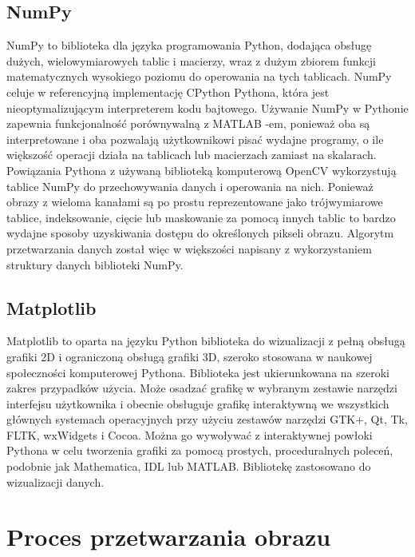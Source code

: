 \documentclass[a4paper,11pt,twoside,openright]{article} %
\begin{document}
\subsection{NumPy}
\noindent  NumPy to biblioteka dla języka programowania Python, dodająca obsługę dużych, wielowymiarowych tablic i macierzy, wraz z dużym zbiorem funkcji matematycznych wysokiego poziomu do operowania na tych tablicach. NumPy celuje w referencyjną implementację CPython Pythona, która jest nieoptymalizującym interpreterem kodu bajtowego. Używanie NumPy w Pythonie zapewnia funkcjonalność porównywalną z MATLAB -em, ponieważ oba są interpretowane i oba pozwalają użytkownikowi pisać wydajne programy, o ile większość operacji działa na tablicach lub macierzach zamiast na skalarach. Powiązania Pythona z używaną biblioteką komputerową OpenCV wykorzystują tablice NumPy do przechowywania danych i operowania na nich. Ponieważ obrazy z wieloma kanałami są po prostu reprezentowane jako trójwymiarowe tablice, indeksowanie, cięcie lub maskowanie za pomocą innych tablic to bardzo wydajne sposoby uzyskiwania dostępu do określonych pikseli obrazu. Algorytm przetwarzania danych został więc w większości napisany z wykorzystaniem struktury danych biblioteki NumPy.

\subsection{Matplotlib}
\noindent Matplotlib to oparta na języku Python biblioteka do wizualizacji z pełną obsługą grafiki 2D i ograniczoną obsługą grafiki 3D, szeroko stosowana w naukowej społeczności komputerowej Pythona. Biblioteka jest ukierunkowana na szeroki zakres przypadków użycia. Może osadzać grafikę w wybranym zestawie narzędzi interfejsu użytkownika i obecnie obsługuje grafikę interaktywną we wszystkich głównych systemach operacyjnych przy użyciu zestawów narzędzi GTK+, Qt, Tk, FLTK, wxWidgets i Cocoa. Można go wywoływać z interaktywnej powłoki Pythona w celu tworzenia grafiki za pomocą prostych, proceduralnych poleceń, podobnie jak Mathematica, IDL lub MATLAB. Bibliotekę zastosowano do wizualizacji danych.

\newpage

\section{Proces przetwarzania obrazu}
\end{document}
